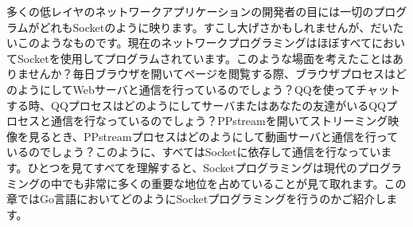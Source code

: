 多くの低レイヤのネットワークアプリケーションの開発者の目には一切のプログラムがどれもSocketのように映ります。すこし大げさかもしれませんが、だいたいこのようなものです。現在のネットワークプログラミングはほぼすべてにおいてSocketを使用してプログラムされています。このような場面を考えたことはありませんか？毎日ブラウザを開いてページを閲覧する際、ブラウザプロセスはどのようにしてWebサーバと通信を行っているのでしょう？QQを使ってチャットする時、QQプロセスはどのようにしてサーバまたはあなたの友達がいるQQプロセスと通信を行なっているのでしょう？PPstreamを開いてストリーミング映像を見るとき、PPstreamプロセスはどのようにして動画サーバと通信を行っているのでしょう？このように、すべてはSocketに依存して通信を行なっています。ひとつを見てすべてを理解すると、Socketプログラミングは現代のプログラミングの中でも非常に多くの重要な地位を占めていることが見て取れます。この章ではGo言語においてどのようにSocketプログラミングを行うのかご紹介します。
